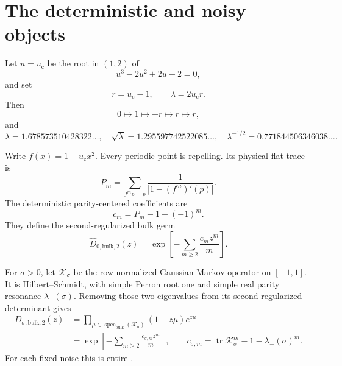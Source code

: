 \documentclass[11pt]{article}
\theoremstyle{definition}
\theoremstyle{remark}
\newcommand{\uc}{u_{\mathrm c}}
\newcommand{\cK}{\mathcal K}
\begin{document}
\section{The deterministic and noisy objects}
\label{sec:setup}

Let $u=\uc$ be the root in $(1,2)$ of
\begin{equation}\label{eq:cubic}
 u^3-2u^2+2u-2=0,
\end{equation}
and set
\begin{equation}\label{eq:constants}
 r=\uc-1,
 \qquad
 \lambda=2\uc r.
\end{equation}
Then
\begin{equation}\label{eq:critical-orbit}
 0\longmapsto1\longmapsto-r\longmapsto r\longmapsto r,
\end{equation}
and
\begin{equation}\label{eq:numerical-constants}
 \lambda=1.678573510428322\ldots,
 \quad
 \sqrt\lambda=1.295597742522085\ldots,
 \quad
 \lambda^{-1/2}=0.771844506346038\ldots.
\end{equation}

Write $f(x)=1-\uc x^2$.  Every periodic point is repelling.  Its physical
flat trace is
\begin{equation}\label{eq:physical-trace}
 P_m=\sum_{f^mp=p}\frac1{|1-(f^m)'(p)|}.
\end{equation}
The deterministic parity-centered coefficients are
\begin{equation}\label{eq:centered-coefficients}
 c_m=P_m-1-(-1)^m.
\end{equation}
They define the second-regularized bulk germ
\begin{equation}\label{eq:deterministic-bulk}
 \widehat D_{0,\mathrm{bulk},2}(z)
 =\exp\left[-\sum_{m\ge2}\frac{c_mz^m}{m}\right].
\end{equation}

For $\sigma>0$, let $\cK_\sigma$ be the row-normalized Gaussian Markov
operator on $[-1,1]$.  It is Hilbert--Schmidt, with simple Perron root one and
simple real parity resonance $\lambda_-(\sigma)$.  Removing those two
eigenvalues from its second regularized determinant gives
\begin{align}
 D_{\sigma,\mathrm{bulk},2}(z)
 &=\prod_{\mu\in\operatorname{spec}_{\mathrm{bulk}}(\cK_\sigma)}
 (1-z\mu)e^{z\mu}
 \label{eq:noisy-product}\\
 &=\exp\left[-\sum_{m\ge2}\frac{c_{\sigma,m}z^m}{m}\right],
 \qquad
 c_{\sigma,m}=\operatorname{tr}\cK_\sigma^m-1-\lambda_-(\sigma)^m.
 \label{eq:noisy-traces}
\end{align}
For each fixed noise this is entire \citep{Simon2005}.
\end{document}
